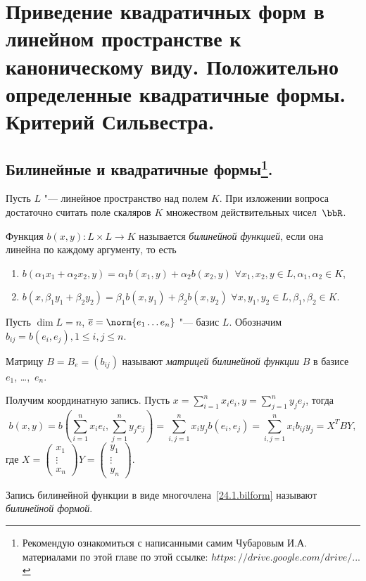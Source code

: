 \chapter{Приведение квадратичных форм в линейном пространстве к каноническому виду. Положительно определенные квадратичные формы. Критерий Сильвестра.}\label{chapter25}

\section[Билинейные и квадратичные формы.]{Билинейные и квадратичные формы\footnote{Рекомендую ознакомиться с написанными самим Чубаровым И.А. материалами по этой главе по этой ссылке: \href{https://drive.google.com/drive/u/0/folders/0BzuzEyNkpwYDcFhhV1l2N1lhY2s}{$https://drive.google.com/drive/...$}}.}
Пусть $L$ "--- линейное пространство над полем $K$. При изложении вопроса достаточно считать поле скаляров $K$ множеством действительных чисел~$\bbR$.
\begin{defn}  
Функция $b(x,y)\colon L\times L\rightarrow K$ называется \textit{билинейной функцией}, если она линейна по каждому аргументу, то есть
\begin{enumerate}
\item 
$b(\alpha_1 x_1+\alpha_2 x_2,y)=\alpha_1 b(x_1,y)+\alpha_2 b(x_2,y)$ $\forall x_1,x_2,y \in L, \alpha_1,\alpha_2 \in K$,
\item 
$b(x,\beta_1 y_1+\beta_2 y_2)=\beta_1 b(x,y_1)+\beta_2 b(x,y_2)$  $\forall x,y_1,y_2 \in L, \beta_1,\beta_2 \in K$.
\end{enumerate}
\end{defn}

Пусть $\dim L=n$, $\overline{e}=\norm{e_1 \ldots e_n}$ "--- базис $L$. Обозначим $b_{ij}=b(e_i,e_j), 1\le i,j \le n$.
\begin{defn}
Матрицу $B=B_e=(b_{ij})$ называют \textit{матрицей билинейной функции} $B$ в базисе $e_1$, \ldots,~$e_n$.
\end{defn}
  
Получим координатную запись. Пусть $x=\sum\limits_{i=1}^nx_ie_i,y=\sum\limits_{j=1}^ny_je_j$, тогда
\begin{equation}\label{24.1.bilform}
b(x,y)=b(\sum_{i=1}^nx_ie_i,\sum_{j=1}^ny_je_j)=\sum_{i,j=1}^nx_iy_jb(e_i,e_j)=\sum_{i,j=1}^nx_ib_{ij}y_j=X^TBY,
\end{equation}
где $X=\begin{pmatrix}
x_1 \\ \vdots \\ x_n
\end{pmatrix} Y=\begin{pmatrix}
y_1 \\ \vdots \\ y_n
\end{pmatrix}$.
\begin{defn}
Запись билинейной функции в виде многочлена~\eqref{24.1.bilform} называют \textit{билинейной формой}.
\end{defn}

